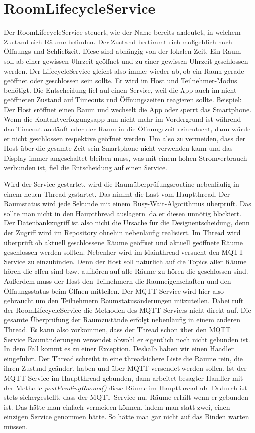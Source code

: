 \section{RoomLifecycleService}
\label{sec:RoomLifecycleService}
Der RoomLifecycleService steuert, wie der Name bereits andeutet, in welchem Zustand sich Räume befinden. Der Zustand bestimmt sich maßgeblich nach Öffnungs und Schließzeit. Diese sind abhängig von der lokalen Zeit. Ein Raum soll ab einer gewissen Uhrzeit geöffnet und zu einer gewissen Uhrzeit geschlossen werden. Der LifecycleService gleicht also immer wieder ab, ob ein Raum gerade geöffnet oder geschlossen sein sollte.
Er wird im Host und Teilnehmer-Modus benötigt. 
Die Entscheidung fiel auf einen Service, weil die App auch im nicht-geöffneten Zustand auf Timeouts und Öffnungszeiten reagieren sollte.
Beispiel: Der Host eröffnet einen Raum und wechselt die App oder sperrt das Smartphone. Wenn die Kontaktverfolgungsapp nun nicht mehr im Vordergrund ist während das Timeout ausläuft oder der Raum in die Öffnungszeit reinrutscht, dann würde er nicht geschlossen respektive geöffnet werden. 
Um also zu vermeiden, dass der Host über die gesamte Zeit sein Smartphone nicht verwenden kann und das Display immer angeschaltet bleiben muss, was mit einem hohen Stromverbrauch verbunden ist, fiel die Entscheidung auf einen Service.

Wird der Service gestartet, wird die Raumüberprüfungsroutine nebenläufig in einem neuen Thread gestartet. Das nimmt die Last vom Hauptthread. Der Raumstatus wird jede Sekunde mit einem Busy-Wait-Algorithmus überprüft. Das sollte man nicht in den Hauptthread auslagern, da er diesen unnötig blockiert. 
Der Datenbankzugriff ist also nicht die Ursache für die Designentscheidung, denn der Zugriff wird im Repository ohnehin nebenläufig realisiert.
Im Thread wird überprüft ob aktuell geschlossene Räume geöffnet und aktuell geöffnete Räume geschlossen werden sollten.
Nebenher wird im Mainthread versucht den MQTT-Service zu einzubinden. Denn der Host soll natürlich auf die Topics aller Räume hören die offen sind bzw. aufhören auf alle Räume zu hören die geschlossen sind.
Außerdem muss der Host den Teilnehmern die Raumeigenschaften und den Öffnungsstatus beim Öffnen mitteilen. Der MQTT-Service wird hier also gebraucht um den Teilnehmern Raumstatusänderungen mitzuteilen.
Dabei ruft der RoomLifecycleService die Methoden des MQTT Services nicht direkt auf. Die gesamte Überprüfung der Raumzustände erfolgt nebenläufig in einem anderen Thread. 
Es kann also vorkommen, dass der Thread schon über den MQTT Service Raumänderungen versendet obwohl er eigentlich noch nicht gebunden ist. In dem Fall kommt es zu einer Exception.
Deshalb haben wir einen Handler eingeführt. Der Thread schreibt in eine threadsichere Liste die Räume rein, die ihren Zustand geändert haben und über MQTT versendet werden sollen. 
Ist der MQTT-Service im Hauptthread gebunden, dann arbeitet besagter Handler mit der Methode \textit{postPendingRooms()} diese Räume im Hauptthread ab. 
Dadurch ist stets sichergestellt, dass der MQTT-Service nur Räume erhält wenn er gebunden ist. Das hätte man einfach vermeiden können, indem man statt zwei, einen einzigen Service genommen hätte. So hätte man gar nicht auf das Binden warten müssen.

